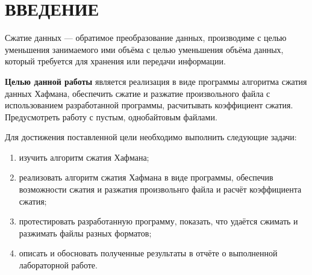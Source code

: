 \chapter*{ВВЕДЕНИЕ}

Сжатие данных --- обратимое преобразование данных, производиме с целью уменьшения занимаемого ими объёма с целью уменьшения объёма данных, который требуется для хранения или передачи информации.

\textbf{Целью данной работы} является реализация в виде программы алгоритма сжатия данных Хафмана, обеспечить сжатие и разжатие произвольного файла с использованием разработанной программы, расчитывать коэффициент сжатия. Предусмотреть работу с пустым, однобайтовым файлами.

Для достижения поставленной цели необходимо выполнить следующие задачи:
\begin{enumerate}[label=\arabic*)]
	\item изучить алгоритм сжатия Хафмана;
	\item реализовать алгоритм сжатия Хафмана в виде программы, обеспечив возможности сжатия и разжатия произвольнго файла и расчёт коэффициента сжатия;
	\item протестировать разработанную программу, показать, что удаётся сжимать и разжимать файлы разных форматов;
	\item описать и обосновать полученные результаты в отчёте о выполненной лабораторной работе.
\end{enumerate}
